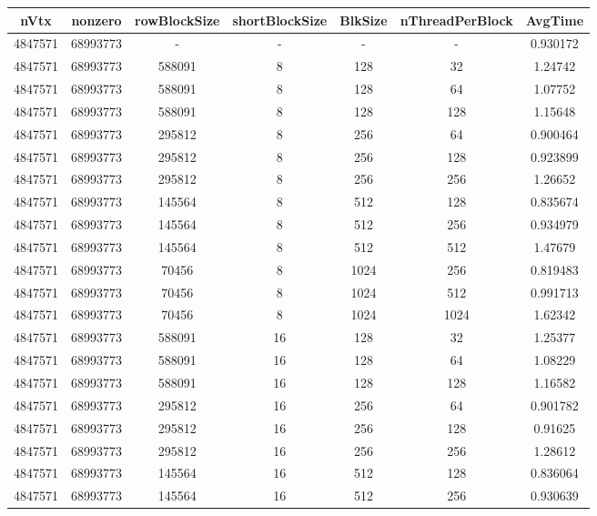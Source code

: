 \documentclass[9pt]{article}
\begin{document}
\SetBgPosition{0.25cm,-5.0cm}
\begin{tabular}{|c|c|c|c|c|c|c| }  
\hline
nVtx  & nonzero  & rowBlockSize  & shortBlockSize  & BlkSize  & nThreadPerBlock  & AvgTime \\
\hline
4847571  & 68993773  &  -  & -  & -  & -  &0.930172 \\
\hline
4847571  & 68993773  & 588091  & 8  & 128  & 32  & 1.24742 \\
\hline
4847571  & 68993773  & 588091  & 8  & 128  & 64  & 1.07752 \\
\hline
4847571  & 68993773  & 588091  & 8  & 128  & 128  & 1.15648 \\
\hline
4847571  & 68993773  & 295812  & 8  & 256  & 64  & 0.900464 \\
\hline
4847571  & 68993773  & 295812  & 8  & 256  & 128  & 0.923899 \\
\hline
4847571  & 68993773  & 295812  & 8  & 256  & 256  & 1.26652 \\
\hline
4847571  & 68993773  & 145564  & 8  & 512  & 128  & 0.835674 \\
\hline
4847571  & 68993773  & 145564  & 8  & 512  & 256  & 0.934979 \\
\hline
4847571  & 68993773  & 145564  & 8  & 512  & 512  & 1.47679 \\
\hline
4847571  & 68993773  & 70456  & 8  & 1024  & 256  & 0.819483 \\
\hline
4847571  & 68993773  & 70456  & 8  & 1024  & 512  & 0.991713 \\
\hline
4847571  & 68993773  & 70456  & 8  & 1024  & 1024  & 1.62342 \\
\hline
4847571  & 68993773  & 588091  & 16  & 128  & 32  & 1.25377 \\
\hline
4847571  & 68993773  & 588091  & 16  & 128  & 64  & 1.08229 \\
\hline
4847571  & 68993773  & 588091  & 16  & 128  & 128  & 1.16582 \\
\hline
4847571  & 68993773  & 295812  & 16  & 256  & 64  & 0.901782 \\
\hline
4847571  & 68993773  & 295812  & 16  & 256  & 128  & 0.91625 \\
\hline
4847571  & 68993773  & 295812  & 16  & 256  & 256  & 1.28612 \\
\hline
4847571  & 68993773  & 145564  & 16  & 512  & 128  & 0.836064 \\
\hline
4847571  & 68993773  & 145564  & 16  & 512  & 256  & 0.930639 \\

\end{tabular}
\end{document}
